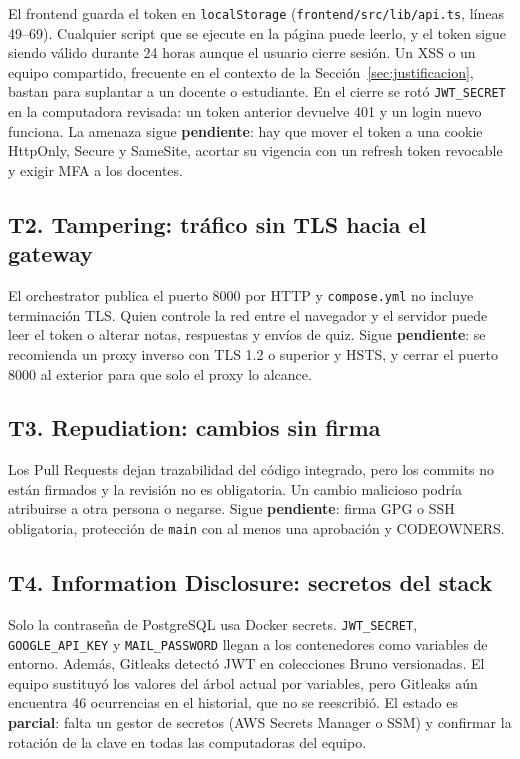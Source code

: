 \documentclass[12pt,a4paper]{article}
\DeclareRobustCommand{\ruta}[1]{\nolinkurl{#1}}
\begin{document}
El frontend guarda el token en \texttt{localStorage} (\ruta{frontend/src/lib/api.ts}, líneas
49--69). Cualquier script que se ejecute en la página puede leerlo, y el token sigue siendo válido
durante 24 horas aunque el usuario cierre sesión. Un XSS o un equipo compartido, frecuente en el
contexto de la Sección~\ref{sec:justificacion}, bastan para suplantar a un docente o estudiante.
En el cierre se rotó \texttt{JWT\_SECRET} en la computadora revisada: un token anterior devuelve 401
y un login nuevo funciona. La amenaza sigue \textbf{pendiente}: hay que mover el token a una cookie
HttpOnly, Secure y SameSite, acortar su vigencia con un refresh token revocable y exigir MFA a los
docentes.

\subsection{T2. Tampering: tráfico sin TLS hacia el gateway}

El orchestrator publica el puerto 8000 por HTTP y \ruta{compose.yml} no incluye terminación TLS.
Quien controle la red entre el navegador y el servidor puede leer el token o alterar notas,
respuestas y envíos de quiz. Sigue \textbf{pendiente}: se recomienda un proxy inverso con TLS 1.2
o superior y HSTS, y cerrar el puerto 8000 al exterior para que solo el proxy lo alcance.

\subsection{T3. Repudiation: cambios sin firma}

Los Pull Requests dejan trazabilidad del código integrado, pero los commits no están firmados y la
revisión no es obligatoria. Un cambio malicioso podría atribuirse a otra persona o negarse. Sigue
\textbf{pendiente}: firma GPG o SSH obligatoria, protección de \texttt{main} con al menos una
aprobación y CODEOWNERS.

\subsection{T4. Information Disclosure: secretos del stack}

Solo la contraseña de PostgreSQL usa Docker secrets. \texttt{JWT\_SECRET},
\texttt{GOOGLE\_API\_KEY} y \texttt{MAIL\_PASSWORD} llegan a los contenedores como variables de
entorno. Además, Gitleaks detectó JWT en colecciones Bruno versionadas. El equipo sustituyó los
valores del árbol actual por variables, pero Gitleaks aún encuentra 46 ocurrencias en el historial,
que no se reescribió. El estado es \textbf{parcial}: falta un gestor de secretos (AWS Secrets
Manager o SSM) y confirmar la rotación de la clave en todas las computadoras del equipo.
\end{document}
